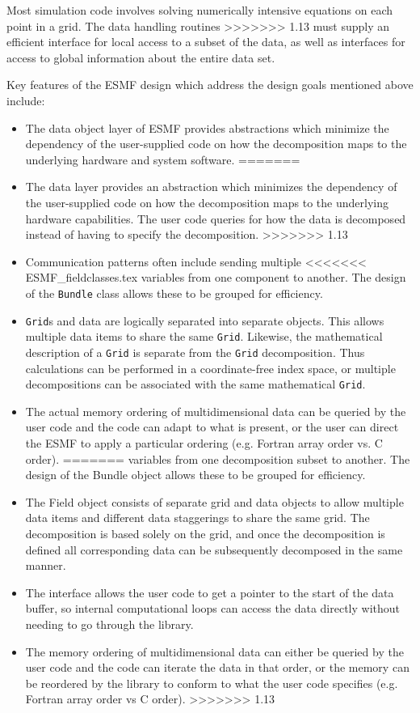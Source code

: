 Most simulation code involves solving numerically intensive
equations on each point in a grid.  The data handling routines
>>>>>>> 1.13
must supply an efficient interface for local access to a
subset of the data, as well as interfaces for access to
global information about the entire data set.

Key features of the ESMF design which address the design goals
mentioned above include:
\begin{itemize}
<<<<<<< ESMF_fieldclasses.tex
\item The data object layer of ESMF provides abstractions which
minimize the dependency of the user-supplied code on 
how the decomposition maps to the underlying hardware and system
software.  
=======
\item The data layer provides an abstraction which
minimizes the dependency of the user-supplied code on 
how the decomposition maps to the underlying hardware
capabilities.  The user code queries for how the data
is decomposed instead of having to specify the decomposition.
>>>>>>> 1.13
\item Communication patterns often include sending multiple
<<<<<<< ESMF_fieldclasses.tex
variables from one component to another.  The design of the {\tt Bundle} 
class allows these to be grouped for efficiency.
\item {\tt Grid}s and data are
logically separated into separate objects.  This allows multiple
data items to share the same {\tt Grid}.  Likewise, the mathematical
description of a {\tt Grid} is separate from the {\tt Grid} decomposition.  
Thus calculations can be performed in a coordinate-free index space, or
multiple decompositions can be associated with the same mathematical 
{\tt Grid}.
\item The actual memory ordering of multidimensional data can be
queried by the user code and the code can adapt to what is present,
or the user can direct the ESMF to apply a particular ordering 
(e.g. Fortran array order vs. C order).
=======
variables from one decomposition subset to another.  
The design of the Bundle object
allows these to be grouped for efficiency.
\item The Field object consists of separate grid and data 
objects to allow multiple data items and different data staggerings
to share the same grid.  The decomposition is based solely on
the grid, and once the decomposition is defined all corresponding
data can be subsequently decomposed in the same manner.
\item The interface allows the user code to get a pointer to the
start of the data buffer, so internal computational loops can access
the data directly without needing to go through the library.
\item The memory ordering of multidimensional data can either be
queried by the user code and the code can iterate the data in that
order, or the memory can be reordered by the library to conform to what
the user code specifies (e.g. Fortran array order vs C order).
>>>>>>> 1.13

\end{itemize}

